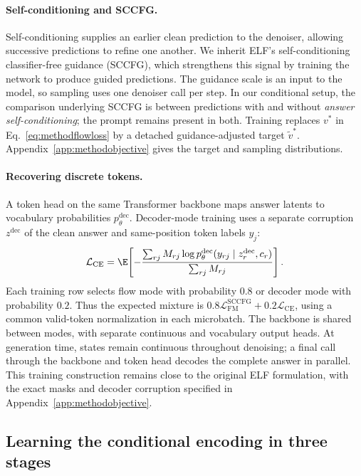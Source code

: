 \paragraph{Self-conditioning and SCCFG.}
Self-conditioning supplies an earlier clean prediction to the denoiser, allowing successive predictions to refine one another. We inherit ELF's self-conditioning classifier-free guidance (SCCFG), which strengthens this signal by training the network to produce guided predictions. The guidance scale is an input to the model, so sampling uses one denoiser call per step. In our conditional setup, the comparison underlying SCCFG is between predictions with and without \emph{answer self-conditioning}; the prompt remains present in both. Training replaces $v^*$ in Eq.~\eqref{eq:methodflowloss} by a detached guidance-adjusted target $\widetilde v^*$. Appendix~\ref{app:methodobjective} gives the target and sampling distributions.

\paragraph{Recovering discrete tokens.}
A token head on the same Transformer backbone maps answer latents to vocabulary probabilities $p_\theta^{\mathrm{dec}}$. Decoder-mode training uses a separate corruption $z^{\mathrm{dec}}$ of the clean answer and same-position token labels $y_j$:
\begin{equation}
 \mathcal L_{\mathrm{CE}}=
 \E\!\left[-\frac{\sum_{rj} M_{rj}\log p_\theta^{\mathrm{dec}}(y_{rj}\mid z_r^{\mathrm{dec}},c_r)}
 {\sum_{rj} M_{rj}}\right].
 \label{eq:methoddecoderloss}
\end{equation}
Each training row selects flow mode with probability $0.8$ or decoder mode with probability $0.2$. Thus the expected mixture is $0.8\mathcal L_{\mathrm{FM}}^{\mathrm{SCCFG}}+0.2\mathcal L_{\mathrm{CE}}$, using a common valid-token normalization in each microbatch. The backbone is shared between modes, with separate continuous and vocabulary output heads. At generation time, states remain continuous throughout denoising; a final call through the backbone and token head decodes the complete answer in parallel. This training construction remains close to the original ELF formulation, with the exact masks and decoder corruption specified in Appendix~\ref{app:methodobjective}.

\subsection{Learning the conditional encoding in three stages}
\label{sec:conditionalencoding}

